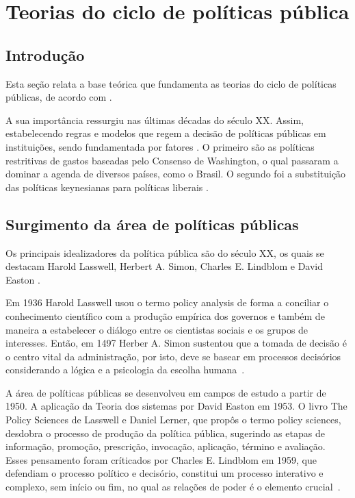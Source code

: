 \section{Teorias do ciclo de políticas pública} \label{politica_publica}


\subsection{Introdução}
Esta seção relata a base teórica que fundamenta as teorias do ciclo de políticas públicas, de acordo com .

A sua importância ressurgiu nas últimas décadas do século XX. 
Assim, estabelecendo regras e modelos que regem a decisão de políticas públicas em instituições, sendo fundamentada por fatores \cite{souza2006politicas}.  
O primeiro são as políticas restritivas de gastos baseadas pelo Consenso de Washington, o qual passaram a dominar a agenda de diversos países, como o Brasil.
O segundo foi a substituição das políticas keynesianas para políticas liberais \cite{resende2014escassez}.


\subsection{Surgimento da área de políticas públicas}


Os principais idealizadores da política pública são do século XX, os quais se destacam Harold Lasswell, Herbert A. Simon, Charles E. Lindblom e David Easton \cite{souza2006politicas}.

Em 1936 Harold Lasswell usou o termo policy analysis de forma a conciliar o conhecimento científico com a produção empírica dos governos e também de maneira a estabelecer o diálogo entre os cientistas sociais e os grupos de interesses. 
Então, em 1497 Herber A. Simon sustentou que a tomada de decisão é o centro vital da administração, por isto, deve se basear em processos decisórios considerando a lógica e a psicologia da escolha humana~\cite{rua2013}.

A área de políticas públicas se desenvolveu em campos de estudo a partir de 1950. 
A aplicação da Teoria dos sistemas por David Easton em 1953.
O livro The Policy Sciences de Lasswell e Daniel Lerner, que propôs o termo policy sciences, desdobra o processo de produção da política pública, sugerindo as etapas de informação, promoção, prescrição, invocação, aplicação, término e avaliação. 
Esses pensamento foram críticados por Charles E. Lindblom em 1959, que defendiam o processo político e decisório, constitui um processo interativo e complexo, sem início ou fim, no qual as relações de poder é o elemento crucial~\cite{rua2013}.

